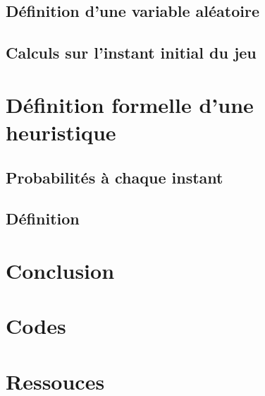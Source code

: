\documentclass[10pt]{report}
\begin{document}
    \section{Définition d'une variable aléatoire}

    \newpage

    \section{Calculs sur l'instant initial du jeu}

    \chapter{Définition formelle d'une heuristique}
    \section{Probabilités à chaque instant}

    \newpage

    \section{Définition}
    
    \chapter{Conclusion}

    \appendix
    \chapter{Codes}

    \newpage

    \chapter{Ressouces}
\end{document}
